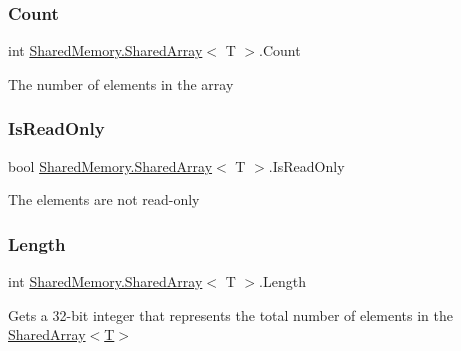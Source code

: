 \subsubsection{\texorpdfstring{Count}{Count}}
{\footnotesize\ttfamily int \hyperlink{class_shared_memory_1_1_shared_array}{Shared\+Memory.\+Shared\+Array}$<$ T $>$.Count\hspace{0.3cm}{\ttfamily [get]}}



The number of elements in the array 

\mbox{\label{class_shared_memory_1_1_shared_array_a76d12c1779622666451bfd90d35d6a6c}} 
\subsubsection{\texorpdfstring{Is\+Read\+Only}{IsReadOnly}}
{\footnotesize\ttfamily bool \hyperlink{class_shared_memory_1_1_shared_array}{Shared\+Memory.\+Shared\+Array}$<$ T $>$.Is\+Read\+Only\hspace{0.3cm}{\ttfamily [get]}}



The elements are not read-\/only 

\mbox{\label{class_shared_memory_1_1_shared_array_a0fc7647fef708e12caf94e7be58f2c3c}} 
\subsubsection{\texorpdfstring{Length}{Length}}
{\footnotesize\ttfamily int \hyperlink{class_shared_memory_1_1_shared_array}{Shared\+Memory.\+Shared\+Array}$<$ T $>$.Length\hspace{0.3cm}{\ttfamily [get]}}



Gets a 32-\/bit integer that represents the total number of elements in the \hyperlink{class_shared_memory_1_1_shared_array_a040ca6a2363a476b8d70ede86470c527}{Shared\+Array$<$\+T$>$} 

